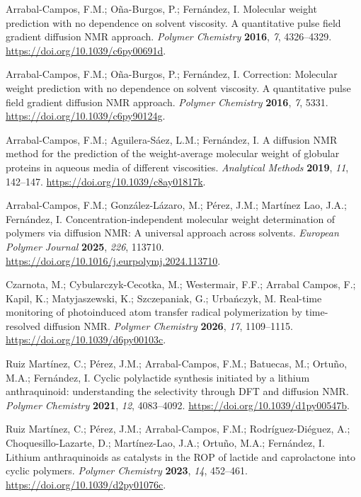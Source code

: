 Arrabal-Campos, F.M.; Oña-Burgos, P.; Fernández, I. Molecular weight prediction with no dependence on solvent viscosity. A quantitative pulse field gradient diffusion NMR approach. \emph{Polymer Chemistry} \textbf{2016}, \emph{7}, 4326--4329. \url{https://doi.org/10.1039/c6py00691d}.

Arrabal-Campos, F.M.; Oña-Burgos, P.; Fernández, I. Correction: Molecular weight prediction with no dependence on solvent viscosity. A quantitative pulse field gradient diffusion NMR approach. \emph{Polymer Chemistry} \textbf{2016}, \emph{7}, 5331. \url{https://doi.org/10.1039/c6py90124g}.

Arrabal-Campos, F.M.; Aguilera-Sáez, L.M.; Fernández, I. A diffusion NMR method for the prediction of the weight-average molecular weight of globular proteins in aqueous media of different viscosities. \emph{Analytical Methods} \textbf{2019}, \emph{11}, 142--147. \url{https://doi.org/10.1039/c8ay01817k}.

Arrabal-Campos, F.M.; González-Lázaro, M.; Pérez, J.M.; Martínez Lao, J.A.; Fernández, I. Concentration-independent molecular weight determination of polymers via diffusion NMR: A universal approach across solvents. \emph{European Polymer Journal} \textbf{2025}, \emph{226}, 113710. \url{https://doi.org/10.1016/j.eurpolymj.2024.113710}.

Czarnota, M.; Cybularczyk-Cecotka, M.; Westermair, F.F.; Arrabal Campos, F.; Kapil, K.; Matyjaszewski, K.; Szczepaniak, G.; Urbańczyk, M. Real-time monitoring of photoinduced atom transfer radical polymerization by time-resolved diffusion NMR. \emph{Polymer Chemistry} \textbf{2026}, \emph{17}, 1109--1115. \url{https://doi.org/10.1039/d6py00103c}.

Ruiz Martínez, C.; Pérez, J.M.; Arrabal-Campos, F.M.; Batuecas, M.; Ortuño, M.A.; Fernández, I. Cyclic polylactide synthesis initiated by a lithium anthraquinoid: understanding the selectivity through DFT and diffusion NMR. \emph{Polymer Chemistry} \textbf{2021}, \emph{12}, 4083--4092. \url{https://doi.org/10.1039/d1py00547b}.

Ruiz Martínez, C.; Pérez, J.M.; Arrabal-Campos, F.M.; Rodríguez-Diéguez, A.; Choquesillo-Lazarte, D.; Martínez-Lao, J.A.; Ortuño, M.A.; Fernández, I. Lithium anthraquinoids as catalysts in the ROP of lactide and caprolactone into cyclic polymers. \emph{Polymer Chemistry} \textbf{2023}, \emph{14}, 452--461. \url{https://doi.org/10.1039/d2py01076c}.

